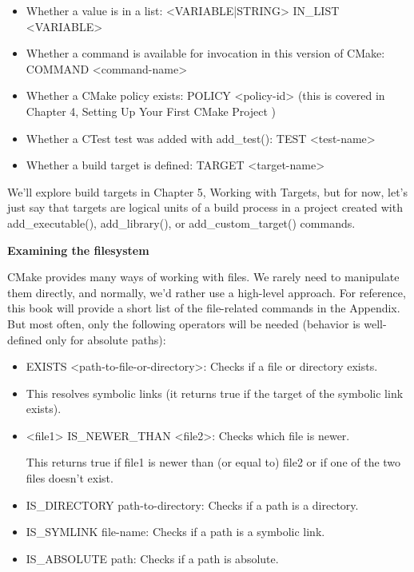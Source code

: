 \begin{itemize}
\item
Whether a value is in a list: <VARIABLE|STRING> IN\_LIST <VARIABLE>

\item
Whether a command is available for invocation in this version of CMake: COMMAND <command-name>

\item
Whether a CMake policy exists: POLICY <policy-id> (this is covered in Chapter 4, Setting Up Your First CMake Project )

\item
Whether a CTest test was added with add\_test(): TEST <test-name>

\item
Whether a build target is defined: TARGET <target-name>
\end{itemize}

We’ll explore build targets in Chapter 5, Working with Targets, but for now, let’s just say that targets are logical units of a build process in a project created with add\_executable(), add\_library(), or add\_custom\_target() commands.

\noindent
\textbf{Examining the filesystem}

CMake provides many ways of working with files. We rarely need to manipulate them directly, and normally, we’d rather use a high-level approach. For reference, this book will provide a short list of the file-related commands in the Appendix. But most often, only the following operators will be needed (behavior is well-defined only for absolute paths):

\begin{itemize}
\item
EXISTS <path-to-file-or-directory>: Checks if a file or directory exists.

\item
This resolves symbolic links (it returns true if the target of the symbolic link exists).

\item
<file1> IS\_NEWER\_THAN <file2>: Checks which file is newer.

This returns true if file1 is newer than (or equal to) file2 or if one of the two files doesn’t exist.

\item
IS\_DIRECTORY path-to-directory: Checks if a path is a directory.

\item
IS\_SYMLINK file-name: Checks if a path is a symbolic link.

\item
IS\_ABSOLUTE path: Checks if a path is absolute.
\end{itemize}

